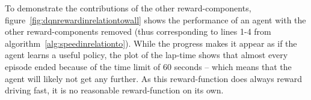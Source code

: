 To demonstrate the contributions of the other reward-components, figure~\ref{fig:dqnrewardinrelationtowall} shows the performance of an agent with the other reward-components removed (thus corresponding to lines 1-4 from algorithm~\ref{alg:speedinrelationto}). While the progress makes it appear as if the agent learns a useful policy, the plot of the lap-time shows that almost every episode ended because of the time limit of 60 seconds -- which means that the agent will likely not get any further. As this reward-function does always reward driving fast, it is no reasonable reward-function on its own.